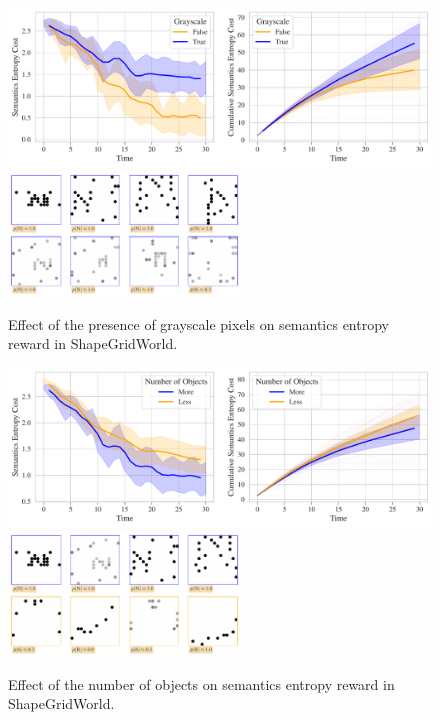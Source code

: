 \begin{figure}[H]
    \centering
    \includegraphics[width=\textwidth]{images/mode_comparison_sgw.pdf}\vspace{6pt}
    \includegraphics[width=0.55\textwidth]{images/mode_samples_sgw.pdf}\vspace{3pt}
    \caption{Effect of the presence of grayscale pixels on semantics entropy reward in ShapeGridWorld.}
    \label{fig:mode-sgw}
\end{figure}

\begin{figure}[H]
    \centering
    \includegraphics[width=\textwidth]{images/n_objects_comparison_sgw.pdf}\vspace{6pt}
    \includegraphics[width=0.55\textwidth]{images/n_objects_samples_sgw.pdf}\vspace{3pt}
    \caption{Effect of the number of objects on semantics entropy reward in ShapeGridWorld.}
    \label{fig:n-objects-sgw}
\end{figure}

